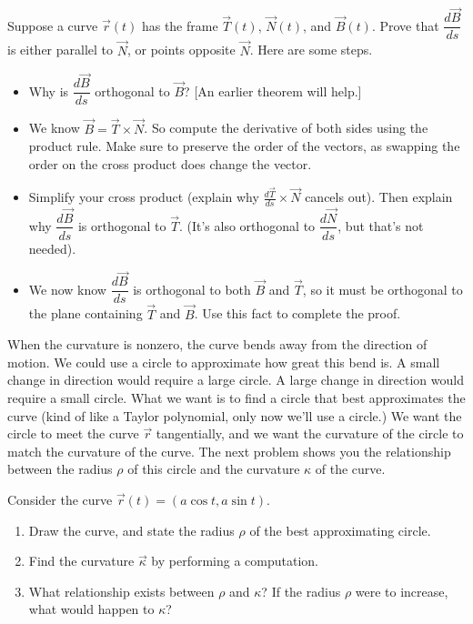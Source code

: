 \begin{problem}%
 Suppose a curve $\vec r(t)$ has the frame $\vec T(t)$, $\vec N(t)$, and $\vec B(t)$. Prove that $\dfrac{d\vec B}{ds}$ is either parallel to $\vec N$, or points opposite $\vec N$. Here are some steps.
 \begin{itemize}
  \item Why is $\dfrac{d\vec B}{ds}$ orthogonal to $\vec B$? [An earlier theorem will help.]
  \item We know $\vec B=\vec T\times \vec N$. So compute the derivative of both sides using the product rule. Make sure to preserve the order of the vectors, as swapping the order on the cross product does change the vector.  
  \item Simplify your cross product (explain why $\frac{d\vec T}{ds}\times \vec N$ cancels out). Then explain why $\dfrac{d\vec B}{ds}$ is orthogonal to $\vec T$. (It's also orthogonal to $\dfrac{d\vec N}{ds}$, but that's not needed).
  \item We now know $\dfrac{d\vec B}{ds}$ is orthogonal to both $\vec B$ and $\vec T$, so it must be orthogonal to the plane containing $\vec T$ and $\vec B$. Use this fact to complete the proof.
 \end{itemize}
\end{problem}


When the curvature is nonzero, the curve bends away from the direction of motion.  We could use a circle to approximate how great this bend is. A small change in direction would require a large circle.  A large change in direction would require a small circle. 
What we want is to find a circle that best approximates the curve (kind of like a Taylor polynomial, only now we'll use a circle.) We want the circle to meet the curve $\vec r$ tangentially, and we want the curvature of the circle to match the curvature of the curve.  The next problem shows you the relationship between the radius $\rho$ of this circle and the curvature $\kappa$ of the curve.

\begin{problem}
 Consider the curve $\vec r(t)=(a\cos t, a\sin t)$.
 \begin{enumerate}
  \item Draw the curve, and state the radius $\rho$ of the best approximating circle.
  \item Find the curvature $\vec \kappa$ by performing a computation.
  \item What relationship exists between $\rho$ and $\kappa$?  If the radius $\rho$ were to increase, what would happen to $\kappa$?
 \end{enumerate}
\end{problem}


